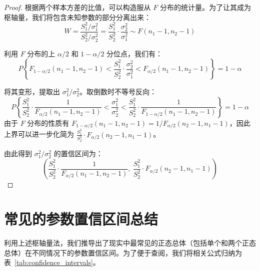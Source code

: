 \documentclass[lang=cn,11pt]{elegantbook}
\begin{document}
\begin{proof}
根据两个样本方差的比值，可以构造服从 $F$ 分布的统计量。为了让其成为枢轴量，我们将包含未知参数的部分分离出来：
\begin{equation*}
W=\frac{S_1^2/\sigma_1^2}{S_2^2/\sigma_2^2} = \frac{S_1^2}{S_2^2}\cdot\frac{\sigma_2^2}{\sigma_1^2} \sim F(n_1-1, n_2-1)
\end{equation*}

利用 $F$ 分布的上 $\alpha/2$ 和 $1-\alpha/2$ 分位点，我们有：
\begin{equation*}
P\left\{F_{1-\alpha/2}(n_1-1, n_2-1) < \frac{S_1^2}{S_2^2}\cdot\frac{\sigma_2^2}{\sigma_1^2} < F_{\alpha/2}(n_1-1, n_2-1)\right\}=1-\alpha
\end{equation*}

将其变形，提取出 $\sigma_1^2/\sigma_2^2$。取倒数时不等号反向：
\begin{equation*}
P\left\{\frac{S_1^2}{S_2^2} \cdot \frac{1}{F_{\alpha/2}(n_1-1, n_2-1)} < \frac{\sigma_1^2}{\sigma_2^2} < \frac{S_1^2}{S_2^2} \cdot \frac{1}{F_{1-\alpha/2}(n_1-1, n_2-1)}\right\}=1-\alpha
\end{equation*}
由于 $F$ 分布的性质有 $F_{1-\alpha/2}(n_1-1, n_2-1) = 1/F_{\alpha/2}(n_2-1, n_1-1)$，因此上界可以进一步化简为 $\frac{S_1^2}{S_2^2} \cdot F_{\alpha/2}(n_2-1, n_1-1)$。

由此得到 $\sigma_1^2/\sigma_2^2$ 的置信区间为：
\begin{equation*}
\left(\frac{S_1^2}{S_2^2}\cdot\frac{1}{F_{\alpha/2}(n_1-1,n_2-1)},\ \frac{S_1^2}{S_2^2}\cdot F_{\alpha/2}(n_2-1,n_1-1)\right)
\end{equation*}
\end{proof}

\section{常见的参数置信区间总结}

利用上述枢轴量法，我们推导出了现实中最常见的正态总体（包括单个和两个正态总体）在不同情况下的参数置信区间。为了便于查阅，我们将相关公式归纳为表~\ref{tab:confidence_intervals}。
\end{document}
